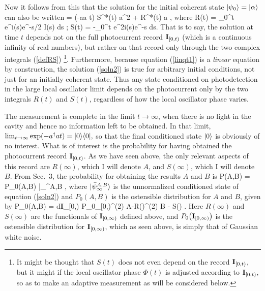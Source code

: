 Now it follows from this that the solution for the initial coherent state
$| {\psi_0} \rangle=| {\alpha} \rangle$ can also be written 
\beq \label{soln2}
 = \exp(-\half a\dg a t) 
\exp \bl \half S^*(t) a^2  + R^*(t) a \br {},
\eeq
where
\beq
R(t) = \int_0^t e^{i\Phi(s)}e^{-s/2} I(s) ds \;;\;\;
S(t) = -\int_0^t e^{2i\Phi(s)}e^{-s} ds. \label{defRS}
\eeq
That is to say, the solution at time $t$ depends not on the full photocurrent
record ${\bf I}_{[0,t)}$ (which is a continuous infinity of real numbers), but
rather on that record only through the two complex integrals
(\ref{defRS}) \footnote{It might be thought that $S(t)$ does not even
depend on the record ${\bf I}_{[0,t)}$, but it might if the local oscillator phase $\Phi(t)$
is adjusted according to ${\bf I}_{[0,t)}$, so as to make an adaptive measurement as will be
considered below.}. Furthermore, because  equation (\ref{linqt1}) is a {\em linear}
equation by construction, the solution (\ref{soln2}) is true for arbitrary initial
conditions, not just for an initially coherent state. Thus any state conditioned on
photodetection in the large local oscillator limit depends on the photocurrent
only by the two integrals $R(t)$ and $S(t)$, regardless of how the local
oscillator phase varies. 

The measurement is complete in the limit $t\to\infty$, when there is no light in the
cavity and hence no information left to be obtained. In that limit,  $
\lim_{t\to \infty} \exp(-a^\dagger a t) = | {0} \rangle\langle {0} |, $
so that the final conditioned state $| {0} \rangle$ is obviously of no interest. What is
of interest is the probability for having obtained the photocurrent record ${\bf I}_{[0,t)}$.
As we have seen above, the only relevant aspects of this record are $R(\infty)$,
which I will denote $A$, and $S(\infty)$, which I will denote $B$. From
Sec.~3, the probability for obtaining the results $A$ and $B$ is 
\beq
P(A,B) = P_0(A,B) \langle \bar\psi_\infty^{A,B} ,
\eeq
where $| {\bar\psi_\infty^{A,B}} \rangle$ is the unnormalized conditioned state of
equation (\ref{soln2}) and $P_0(A,B)$ is the ostensible distribution for $A$ and $B$,
given by \beq \label{P0AB} P_0(A,B) = \int d{\bf I}_{[0,\infty)} P_0_{[0,\infty)}\br \delta^{(2)} \bl A-R(\infty)\br \delta^{(2)} \bl B -  S(\infty) \br.
\eeq
Here $R(\infty)$ and $S(\infty)$ are the functionals of ${\bf I}_{[0,\infty)}$
defined above, and $ P_0{\bigl(} {\bf I}_{[0,\infty)}{\bigr)}$ is the ostensible
distribution for ${\bf I}_{[0,\infty)}$, which as seen above, is simply that of
Gaussian white noise.

